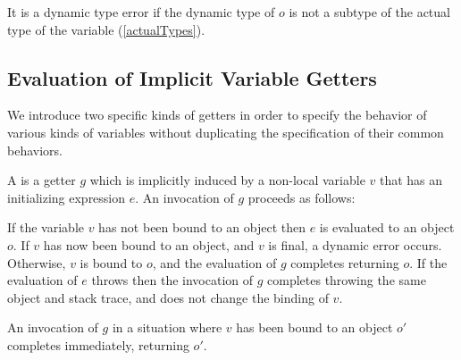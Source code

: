 \documentclass[makeidx]{article}
\begin{document}


\LMHash{}%
It is a dynamic type error if the dynamic type of $o$ is not
a subtype of the actual type of the variable \id{}
(\ref{actualTypes}).


\subsection{Evaluation of Implicit Variable Getters}

\LMHash{}%
We introduce two specific kinds of getters in order to specify
the behavior of various kinds of variables
without duplicating the specification of their common behaviors.

\LMHash{}%
A
is a getter $g$ which is implicitly induced by a non-local variable $v$
that has an initializing expression $e$.
An invocation of $g$ proceeds as follows:

\LMHash{}%
If the variable $v$ has not been bound to an object then
$e$ is evaluated to an object $o$.
If $v$ has now been bound to an object, and $v$ is final,
a dynamic error occurs. %
Otherwise, $v$ is bound to $o$,
and the evaluation of $g$ completes returning $o$.
If the evaluation of $e$ throws then
the invocation of $g$ completes throwing the same object and stack trace,
and does not change the binding of $v$.

\LMHash{}%
An invocation of $g$ in a situation where $v$ has been bound to an object $o'$
completes immediately, returning $o'$.

\end{document}
